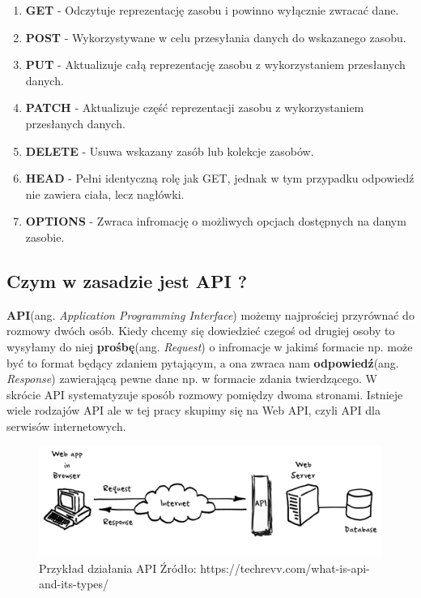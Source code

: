 \documentclass[oneside,polski,logo,indent]{amuthesis}
\begin{document}
\begin{enumerate}
\item \textbf{GET} - Odczytuje reprezentację zasobu i powinno wyłącznie zwracać dane.
\item \textbf{POST} - Wykorzystywane w celu przesyłania danych do wskazanego zasobu.
\item \textbf{PUT} - Aktualizuje całą reprezentację zasobu z wykorzystaniem przesłanych danych.
\item \textbf{PATCH} - Aktualizuje część reprezentacji zasobu z wykorzystaniem przesłanych danych.
\item \textbf{DELETE} - Usuwa wskazany zasób lub kolekcje zasobów.
\item \textbf{HEAD} - Pełni identyczną rolę jak GET, jednak w tym przypadku odpowiedź nie zawiera ciała, lecz nagłówki.
\item \textbf{OPTIONS} - Zwraca infromację o możliwych opcjach dostępnych na danym zasobie.
\end{enumerate}

\begin{center}
\subsection{Czym w zasadzie jest API ?}
\end{center}
\textbf{API}(ang. \emph{Application Programming Interface}) możemy najprościej przyrównać do rozmowy dwóch osób. Kiedy chcemy się dowiedzieć czegoś od drugiej osoby to wysyłamy do niej \textbf{prośbę}(ang. \emph{Request}) o infromacje w jakimś formacie np. może być to format będący zdaniem pytającym, a ona zwraca nam \textbf{odpowiedź}(ang. \emph{Response}) zawierającą pewne dane np. w formacie zdania twierdzącego. W skrócie API systematyzuje sposób rozmowy pomiędzy dwoma stronami. Istnieje wiele rodzajów API ale w tej pracy skupimy się na Web API, czyli API dla serwisów internetowych. 

\begin{figure}[H]
\centering
\includegraphics[width=14cm]{api.png}
\caption{Przykład działania API\newline
Źródło: https://techrevv.com/what-is-api-and-its-types/}
\label{Cache}
\end{figure}
\end{document}
